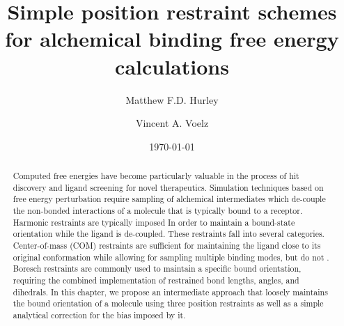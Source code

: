\documentclass[%
 aip,
 rsi,
 jmp,%
 amsmath,amssymb,
 reprint,%
]{revtex4-1}
\begin{document}
\title[Simple restraint schemes for binding free energies]{Simple position restraint schemes for alchemical binding free energy calculations}%




\author{Matthew F.D. Hurley}
\author{Vincent A. Voelz}


\date{\today}%

\begin{abstract}

Computed free energies have become particularly valuable in the process of hit discovery and ligand screening for novel therapeutics. Simulation techniques based on free energy perturbation require sampling of alchemical intermediates which de-couple the non-bonded interactions of a molecule that is typically bound to a receptor. Harmonic restraints are typically imposed In order to maintain a bound-state orientation while the ligand is de-coupled. These restraints fall into several categories. Center-of-mass (COM) restraints are sufficient for maintaining the ligand close to its original conformation while allowing for sampling multiple binding modes, but do not . Boresch restraints are commonly used to maintain a specific bound orientation, requiring the combined implementation of restrained bond lengths, angles, and dihedrals. In this chapter, we propose an intermediate approach that loosely maintains the bound orientation of a molecule using three position restraints as well as a simple analytical correction for the bias imposed by it.
\end{abstract}
\end{document}
